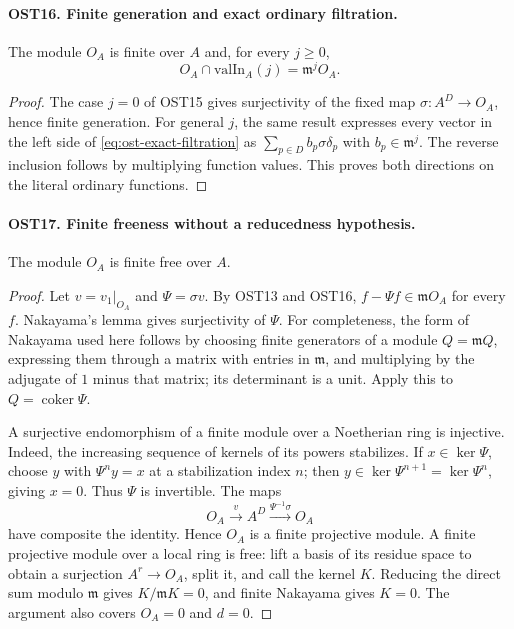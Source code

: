 \paragraph{OST16. Finite generation and exact ordinary filtration.}
\label{claim:OST16}
The module $O_A$ is finite over $A$ and, for every $j\geq0$,
\begin{equation}\label{eq:ost-exact-filtration}
                     O_A\cap\mathrm{valIn}_A(j)=\mathfrak m^jO_A.
\end{equation}
\begin{proof}
The case $j=0$ of OST15 gives surjectivity of the fixed map
$\sigma:A^D\to O_A$, hence finite generation.  For general
$j$, the same result expresses every vector in the left side
of \eqref{eq:ost-exact-filtration} as
$\sum_{p\in D}b_p\sigma\delta_p$ with $b_p\in\mathfrak m^j$.
The reverse inclusion follows by multiplying function values.
This proves both directions on the literal ordinary functions.
\end{proof}

\paragraph{OST17. Finite freeness without a reducedness hypothesis.}
\label{claim:OST17}
The module $O_A$ is finite free over $A$.
\begin{proof}
Let $v=v_1|_{O_A}$ and $\Psi=\sigma v$.  By OST13 and OST16,
$f-\Psi f\in\mathfrak mO_A$ for every $f$.  Nakayama's
lemma gives surjectivity of $\Psi$.  For completeness, the
form of Nakayama used here follows by choosing finite generators
of a module $Q=\mathfrak mQ$, expressing them through a matrix
with entries in $\mathfrak m$, and multiplying by the adjugate
of $1$ minus that matrix; its determinant is a unit.  Apply
this to $Q=\operatorname{coker}\Psi$.

A surjective endomorphism of a finite module over a Noetherian
ring is injective.  Indeed, the increasing sequence of kernels
of its powers stabilizes.  If $x\in\ker\Psi$, choose $y$
with $\Psi^ny=x$ at a stabilization index $n$; then
$y\in\ker\Psi^{n+1}=\ker\Psi^n$, giving $x=0$.
Thus $\Psi$ is invertible.  The maps
\[
 O_A\xrightarrow{v}A^D
       \xrightarrow{\Psi^{-1}\sigma}O_A
\]
have composite the identity.  Hence $O_A$ is a finite
projective module.  A finite projective module over a local
ring is free: lift a basis of its residue space to obtain
a surjection $A^r\to O_A$, split it, and call the kernel
$K$.  Reducing the direct sum modulo $\mathfrak m$ gives
$K/\mathfrak mK=0$, and finite Nakayama gives $K=0$.
The argument also covers $O_A=0$ and $d=0$.
\end{proof}

